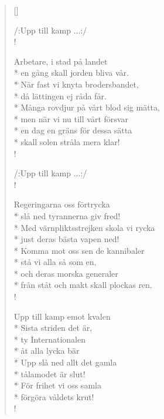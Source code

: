 \begin{verse}[\versewidth]

/:Upp till kamp ...:/\\!


Arbetare, i stad på landet\\*
en gång skall jorden bliva vår.\\*
När fast vi knyta brodersbandet,\\*
då lättingen ej råda får.\\*
Många rovdjur på vårt blod sig mätta,\\*
men när vi nu till vårt försvar\\*
en dag en gräns för dessa sätta\\*
skall solen stråla mera klar!\\!


/:Upp till kamp ...:/\\!


Regeringarna oss förtrycka\\*
slå ned tyrannerna giv fred!\\*
Med värnpliktsstrejken skola vi rycka\\*
just deras bästa vapen ned!\\*
Komma mot oss sen de kannibaler\\*
stå vi alla så som en,\\*
och deras morska generaler\\*
från ståt och makt skall plockas ren.\\! 


Upp till kamp emot kvalen\\*
Sista striden det är,\\*
ty Internationalen\\*
åt alla lycka bär\\*
Upp slå ned allt det gamla\\*
tålamodet är slut!\\*
För frihet vi oss samla\\*
förgöra våldets krut!\\!




\end{verse}

